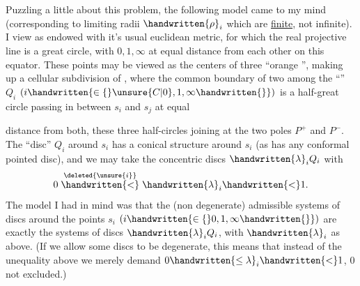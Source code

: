 Puzzling a little about this problem, the following model came to my mind (corresponding to limiting radii $\handwritten{\rho}_i$ which are \uline{finite}, not infinite). I view \handwritten{$\Sigma$} as endowed with it's usual euclidean metric, for which the real projective line is a great circle, with $0,1,\infty$ at equal distance from each other on this equator. These points may be viewed as the centers of three ``orange '', making up a cellular subdivision of \handwritten{$\Sigma$}, where the common boundary of two among the ``'' $Q_i$ $(i\handwritten{\in\{}\unsure{C|0},1,\infty\handwritten{\}})$ is a half-great circle passing in between $s_i$ and $s_j$ at equal


distance from both, these three half-circles joining at the two poles $P^+$ and $P^-$. The ``disc'' $Q_i$ around $s_i$ has a conical structure around $s_i$ (as has any conformal pointed disc), and we may take the concentric  discs $\handwritten{\lambda}_i Q_i$ with
\[
0\mathrel{\overset{\deleted{\unsure{i}}}{\handwritten{<}}}\handwritten{\lambda}_i\handwritten{<}1.
\]
The model I had in mind was that the (non degenerate) admissible systems of discs around the points $s_i$ $(i\handwritten{\in\{}0,1,\infty\handwritten{\}})$ are exactly the systems of discs $\handwritten{\lambda}_i Q_i$, with $\handwritten{\lambda}_i$ as above. (If we allow some discs to be degenerate, this means that instead of the unequality above we merely demand $0\handwritten{\leq\lambda}_i\handwritten{<}1$, $0$ not excluded.)

